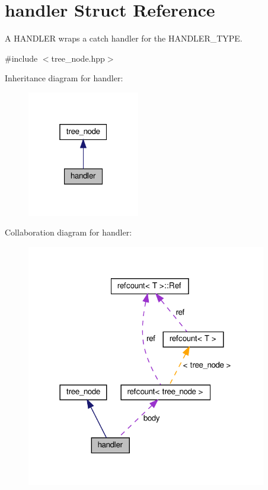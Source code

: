 \hypertarget{structhandler}{}\section{handler Struct Reference}
\label{structhandler}


A H\+A\+N\+D\+L\+ER wraps a catch handler for the H\+A\+N\+D\+L\+E\+R\+\_\+\+T\+Y\+PE.  




{\ttfamily \#include $<$tree\+\_\+node.\+hpp$>$}



Inheritance diagram for handler\+:
\nopagebreak
\begin{figure}[H]
\begin{center}
\leavevmode
\includegraphics[width=139pt]{d8/d28/structhandler__inherit__graph}
\end{center}
\end{figure}


Collaboration diagram for handler\+:
\nopagebreak
\begin{figure}[H]
\begin{center}
\leavevmode
\includegraphics[width=297pt]{d4/daa/structhandler__coll__graph}
\end{center}
\end{figure}
